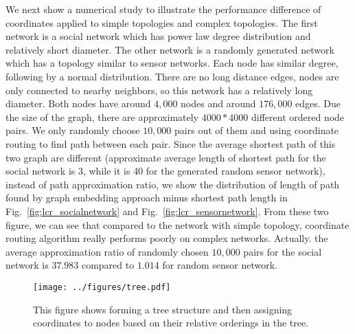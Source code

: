 We next show a numerical study to illustrate the performance difference of coordinates applied to simple topologies and complex topologies. The first network is a social network which has power law degree distribution and relatively short diameter. The other network is a randomly generated network which has a topology similar to sensor networks. Each node has similar degree, following by a normal distribution. There are no long distance edges, nodes are only connected to nearby neighbors, so this network has a relatively long diameter. Both nodes have around $4,000$ nodes and around $176,000$ edges. Due the size of the graph, there are approximately $4000 * 4000$ different ordered node pairs. We only randomly choose $10,000$ pairs out of them and using coordinate routing to find path between each pair. Since the average shortest path of this two graph are different (approximate average length of shortest path for the social network is 3, while it is 40 for the generated random sensor network), instead of path approximation ratio, we show the distribution of length of path found by graph embedding approach minus shortest path length in Fig.~\ref{fig:lcr_socialnetwork} and Fig.~\ref{fig:lcr_sensornetwork}. From these two figure, we can see that compared to the network with simple topology, coordinate routing algorithm really performs poorly on complex networks. Actually. the average approximation ratio of randomly chosen $10,000$ pairs for the social network is $37.983$ compared to $1.014$ for random sensor network.
\begin{figure*}[t]
  \centering
  \texttt{[image: ../figures/tree.pdf]}
  \caption{This figure shows forming a tree structure and then assigning coordinates to nodes based on their relative orderings in the tree.}
  \label{fig:tree}
  \vspace{-3mm}
\end{figure*}
